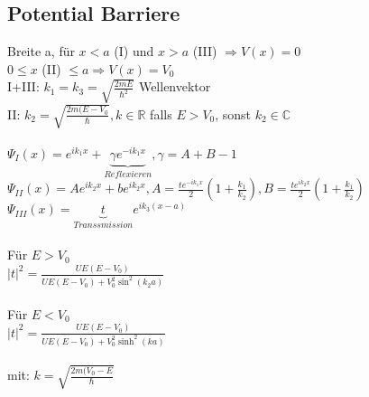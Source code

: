 \documentclass[10pt,a4paper]{article}
\begin{document}
\subsection{Potential Barriere}
%
Breite a, für $x<a$ (I) und $x > a$ (III) $\Rightarrow V(x)=0$\\
$0\leq x$ (II) $\leq a \Rightarrow V(x)=V_0$\\
I+III: $k_1=k_3=\sqrt{\frac{2mE}{\hbar^2}}$ Wellenvektor\\
II: $k_2=\sqrt{\frac{2m(E-V_0}{\hbar}}, k \in \mathbb{R}$ falls $E>V_0$, sonst $k_2\in \mathbb{C}$\\
%
\\
$\Psi_I(x)=e^{ik_1x}+\underbrace{\gamma e^{-ik_1x}}_{Reflexieren}, \gamma = A+B-1$\\
$\Psi_{II}(x)=Ae^{ik_2x}+be^{ik_2x},A= \frac{te^{-ik_1x}}{2}(1+\frac{k_1}{k_2}),B=\frac{te^{ik_2x}}{2}(1+\frac{k_1}{k_2})$\\
$\Psi_{III}(x)=\underbrace{t}_{Transsmission}e^{ik_3(x-a)}$\\
%
\\
Für $E > V_0$\\
$|t|^2=\frac{UE(E-V_0)}{UE(E-V_0)+V_0^2\sin^2(k_2a)}$\\
%
\\
Für $E < V_0$\\
$|t|^2=\frac{UE(E-V_0)}{UE(E-V_0)+V_0^2\sinh^2(ka)}$\\
%
\\
mit: $k=\sqrt{\frac{2m(V_0-E}{\hbar}}$
\end{document}

